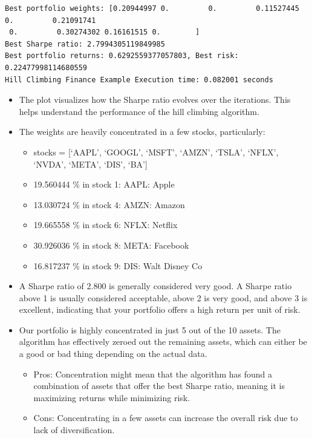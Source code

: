 \documentclass[
  letterpaper,
  DIV=11,
  numbers=noendperiod]{scrreprt}
\providecommand{\tightlist}{%
  \setlength{\itemsep}{0pt}\setlength{\parskip}{0pt}}\usepackage{longtable,booktabs,array}
\begin{document}
\begin{verbatim}
Best portfolio weights: [0.20944997 0.         0.         0.11527445 0.         0.21091741
 0.         0.30274302 0.16161515 0.        ]
Best Sharpe ratio: 2.7994305119849985
Best portfolio returns: 0.6292559377057803, Best risk: 0.22477998114680559
Hill Climbing Finance Example Execution time: 0.082001 seconds
\end{verbatim}

\begin{itemize}
\tightlist
\item
  The plot visualizes how the Sharpe ratio evolves over the iterations.
  This helps understand the performance of the hill climbing algorithm.
\item
  The weights are heavily concentrated in a few stocks, particularly:

  \begin{itemize}
  \tightlist
  \item
    stocks = {[}`AAPL', `GOOGL', `MSFT', `AMZN', `TSLA', `NFLX', `NVDA',
    `META', `DIS', `BA'{]}
  \item
    19.560444 \% in stock 1: AAPL: Apple
  \item
    13.030724 \% in stock 4: AMZN: Amazon
  \item
    19.665558 \% in stock 6: NFLX: Netflix
  \item
    30.926036 \% in stock 8: META: Facebook
  \item
    16.817237 \% in stock 9: DIS: Walt Disney Co
  \end{itemize}
\item
  A Sharpe ratio of 2.800 is generally considered very good. A Sharpe
  ratio above 1 is usually considered acceptable, above 2 is very good,
  and above 3 is excellent, indicating that your portfolio offers a high
  return per unit of risk.
\item
  Our portfolio is highly concentrated in just 5 out of the 10 assets.
  The algorithm has effectively zeroed out the remaining assets, which
  can either be a good or bad thing depending on the actual data.

  \begin{itemize}
  \tightlist
  \item
    Pros: Concentration might mean that the algorithm has found a
    combination of assets that offer the best Sharpe ratio, meaning it
    is maximizing returns while minimizing risk.
  \item
    Cons: Concentrating in a few assets can increase the overall risk
    due to lack of diversification.
  \end{itemize}
\end{itemize}
\end{document}
